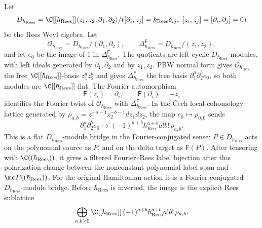 \begin{thm}
  \label{thm:T5-fourier-rees-positive-construction}
  Let
  \[
    D_{\hbar_{\mathrm{Rees}}}=
    \C[[\hbar_{\mathrm{Rees}}]]\langle z_1,z_2,\partial_1,\partial_2\rangle/
    ([\partial_i,z_j]=\hbar_{\mathrm{Rees}}\delta_{ij},\ [z_i,z_j]=[\partial_i,\partial_j]=0)
  \]
  be the Rees Weyl algebra.  Let
  \[
    \mathcal O_{\hbar_{\mathrm{Rees}}}
      =D_{\hbar_{\mathrm{Rees}}}/(\partial_1,\partial_2),\qquad
    \Delta^{\mathsf F}_{\hbar_{\mathrm{Rees}}}
      =D_{\hbar_{\mathrm{Rees}}}/(z_1,z_2),
  \]
  and let \(e_0\) be the image of \(1\) in
  \(\Delta^{\mathsf F}_{\hbar_{\mathrm{Rees}}}\).  The quotients are left cyclic
  \(D_{\hbar_{\mathrm{Rees}}}\)-modules, with left ideals generated by
  \(\partial_1,\partial_2\) and by \(z_1,z_2\). PBW normal form gives
  \(\mathcal O_{\hbar_{\mathrm{Rees}}}\) the free
  \(\C[[\hbar_{\mathrm{Rees}}]]\)-basis \(z_1^az_2^b\)
  and gives \(\Delta^{\mathsf F}_{\hbar_{\mathrm{Rees}}}\) the free basis
  \(\partial_1^a\partial_2^b e_0\), so both modules are
  \(\C[[\hbar_{\mathrm{Rees}}]]\)-flat.  The Fourier automorphism
  \[
    \mathsf F(z_i)=\partial_i,\qquad
    \mathsf F(\partial_i)=-z_i
  \]
  identifies the Fourier twist of \(\mathcal O_{\hbar_{\mathrm{Rees}}}\) with
  \(\Delta^{\mathsf F}_{\hbar_{\mathrm{Rees}}}\).  In the \v{C}ech local-cohomology lattice
  generated by
  \(\rho_{a,b}=z_1^{-a-1}z_2^{-b-1}dz_1dz_2\), the map
  \(e_0\mapsto\rho_{0,0}\) sends
  \[
    \partial_1^a\partial_2^b e_0
      \longmapsto
      (-1)^{a+b}\hbar_{\mathrm{Rees}}^{a+b}a!b!\,\rho_{a,b}.
  \]
  This is a flat \(D_{\hbar_{\mathrm{Rees}}}\)-module bridge in the Fourier-conjugated
  sense: \(P\in D_{\hbar_{\mathrm{Rees}}}\) acts on the polynomial source as \(P\), and on
  the delta target as \(\mathsf F(P)\).  After tensoring with
	  \(\C((\hbar_{\mathrm{Rees}}))\), it gives a filtered Fourier--Rees label bijection after
	  this polarization change between the nonconstant polynomial label span and
	  \(\mc P((\hbar_{\mathrm{Rees}}))\).  For the original Hamiltonian action it is a
	  Fourier-conjugated \(D_{\hbar_{\mathrm{Rees}}}\)-module bridge.  Before \(\hbar_{\mathrm{Rees}}\) is inverted,
  the image is
  the explicit Rees sublattice
  \[
    \bigoplus_{a,b\ge0}
      \C[[\hbar_{\mathrm{Rees}}]]\,(-1)^{a+b}\hbar_{\mathrm{Rees}}^{a+b}a!b!\,\rho_{a,b}.
  \]
\end{thm}

